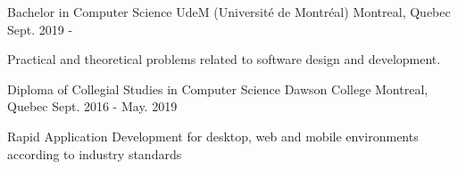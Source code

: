 

\begin{cventries}

  \cventry
    {Bachelor in Computer Science} %
    {UdeM (Université de Montréal)} %
    {Montreal, Quebec} %
    {Sept. 2019 -} %
    {
      \begin{cvitems} %
        \item {Practical and theoretical problems related to software design and development.}
      \end{cvitems}
    }
  \cventry
    {Diploma of Collegial Studies in Computer Science} %
    {Dawson College} %
    {Montreal, Quebec} %
    {Sept. 2016 - May. 2019} %
    {
      \begin{cvitems} %
        \item {Rapid Application Development for desktop, web and mobile environments according to industry standards}
      \end{cvitems}
    }

\end{cventries}
